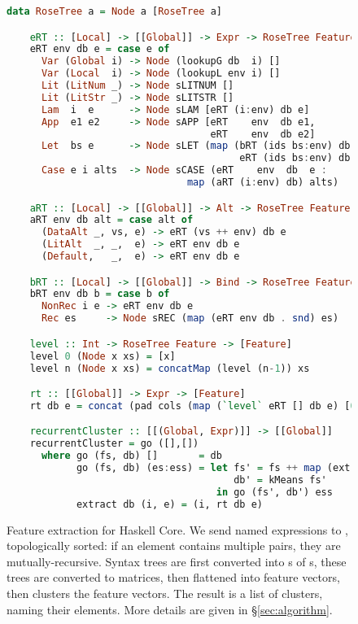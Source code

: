 \begin{figure}
  \begin{lstlisting}[language=Haskell, xleftmargin=.1\textwidth, xrightmargin=.1\textwidth]
    data RoseTree a = Node a [RoseTree a]

    eRT :: [Local] -> [[Global]] -> Expr -> RoseTree Feature
    eRT env db e = case e of
      Var (Global i) -> Node (lookupG db  i) []
      Var (Local  i) -> Node (lookupL env i) []
      Lit (LitNum _) -> Node sLITNUM []
      Lit (LitStr _) -> Node sLITSTR []
      Lam  i  e      -> Node sLAM [eRT (i:env) db e]
      App  e1 e2     -> Node sAPP [eRT    env  db e1,
                                   eRT    env  db e2]
      Let  bs e      -> Node sLET (map (bRT (ids bs:env) db) bs ++
                                        eRT (ids bs:env) db  e
      Case e i alts  -> Node sCASE (eRT    env  db  e :
                               map (aRT (i:env) db) alts)

    aRT :: [Local] -> [[Global]] -> Alt -> RoseTree Feature
    aRT env db alt = case alt of
      (DataAlt _, vs, e) -> eRT (vs ++ env) db e
      (LitAlt  _, _,  e) -> eRT env db e
      (Default,   _,  e) -> eRT env db e

    bRT :: [Local] -> [[Global]] -> Bind -> RoseTree Feature
    bRT env db b = case b of
      NonRec i e -> eRT env db e
      Rec es     -> Node sREC (map (eRT env db . snd) es)

    level :: Int -> RoseTree Feature -> [Feature]
    level 0 (Node x xs) = [x]
    level n (Node x xs) = concatMap (level (n-1)) xs

    rt :: [[Global]] -> Expr -> [Feature]
    rt db e = concat (pad cols (map (`level` eRT [] db e) [0..rows]))

    recurrentCluster :: [[(Global, Expr)]] -> [[Global]]
    recurrentCluster = go ([],[])
      where go (fs, db) []       = db
            go (fs, db) (es:ess) = let fs' = fs ++ map (extract db) es
                                       db' = kMeans fs'
                                    in go (fs', db') ess
            extract db (i, e) = (i, rt db e)
  \end{lstlisting}
  \caption{Feature extraction for Haskell Core. We send named expressions to , topologically sorted: if an element contains multiple  pairs, they are mutually-recursive. Syntax trees are first converted into s of s, these trees are converted to matrices, then flattened into feature vectors, then  clusters the feature vectors. The result is a list of clusters, naming their elements. More details are given in \S \ref{sec:algorithm}.}
  \label{fig:featureextractionalgorithm}
\end{figure}

